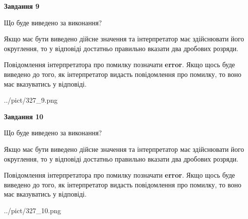 \documentclass[12pt, ukrainian]{article}
\begin{document}
{\begin {Large}
{\begin {center}\textbf{Завдання 9}\end {center}}\par
Що буде виведено за виконання? \par

Якщо має бути виведено дійсне значення та інтерпретатор має здійснювати його округлення, 
то у відповіді достатньо правильно вказати два дробових розряди.

Повідомлення інтерпретатора про помилку позначати \textbf{error}.
Якщо щось буде виведено до того, як інтерпретатор видасть повідомлення про помилку, 
то воно має вказуватись у відповіді. \par

\begin{center}
	{../pict/327_9.png}
\end{center}
\newpage

{\begin {center}\textbf{Завдання 10}\end {center}}\par
Що буде виведено за виконання? \par

Якщо має бути виведено дійсне значення та інтерпретатор має здійснювати його округлення, 
то у відповіді достатньо правильно вказати два дробових розряди.

Повідомлення інтерпретатора про помилку позначати \textbf{error}.
Якщо щось буде виведено до того, як інтерпретатор видасть повідомлення про помилку, 
то воно має вказуватись у відповіді. \par

\begin{center}
	{../pict/327_10.png}
\end{center}
\newpage

\end {Large}}
\end{document}
